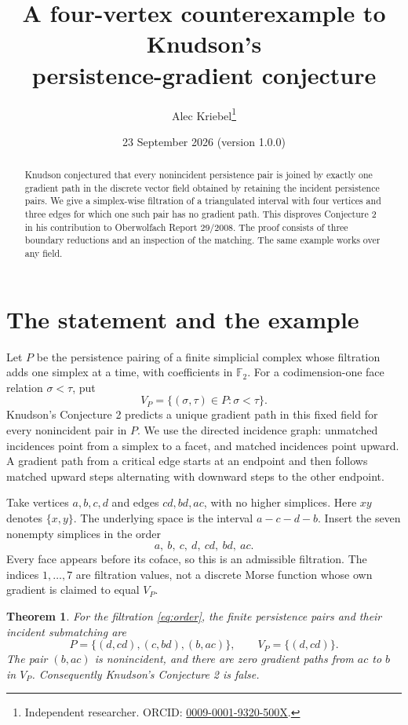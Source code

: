 \documentclass[11pt]{article}
\title{A four-vertex counterexample to Knudson's\protect\\ persistence-gradient conjecture}
\author{Alec Kriebel\thanks{Independent researcher. ORCID: \href{https://orcid.org/0009-0001-9320-500X}{0009-0001-9320-500X}.}}
\date{23 September 2026 \quad (version 1.0.0)}
\newtheorem{theorem}{Theorem}
\newcommand{\F}{\mathbb F}
\begin{document}
\maketitle
\begin{abstract}
Knudson conjectured that every nonincident persistence pair is joined by
exactly one gradient path in the discrete vector field obtained by retaining
the incident persistence pairs. We give a simplex-wise filtration of a
triangulated interval with four vertices and three edges for which one such
pair has no gradient path. This disproves Conjecture 2 in his contribution
to Oberwolfach Report 29/2008. The proof consists of three boundary reductions
and an inspection of the matching. The same example works over any field.
\end{abstract}

\section{The statement and the example}
Let $P$ be the persistence pairing of a finite simplicial complex whose
filtration adds one simplex at a time, with coefficients in $\F_2$.
For a codimension-one face relation $\sigma<\tau$, put
\[
 V_P=\{(\sigma,\tau)\in P:\sigma<\tau\}.
\]
Knudson's Conjecture 2 \cite[p.~1629]{Knudson} predicts a unique gradient
path in this fixed field for every nonincident pair in $P$.
We use the directed incidence graph: unmatched incidences point from a
simplex to a facet, and matched incidences point upward. A gradient path
from a critical edge starts at an endpoint and then follows matched upward
steps alternating with downward steps to the other endpoint.

Take vertices $a,b,c,d$ and edges $cd,bd,ac$, with no higher simplices.
Here $xy$ denotes $\{x,y\}$. The underlying space is the interval
$a\! -\! c\! -\! d\! -\! b$.
Insert the seven nonempty simplices in the order
\begin{equation}\label{eq:order}
             a,\ b,\ c,\ d,\ cd,\ bd,\ ac.
\end{equation}
Every face appears before its coface, so this is an admissible filtration.
The indices $1,\ldots,7$ are filtration values, not a discrete Morse function
whose own gradient is claimed to equal $V_P$.

\begin{theorem}
For the filtration \eqref{eq:order}, the finite persistence pairs and their
incident submatching are
\[
 P=\{(d,cd),(c,bd),(b,ac)\},\qquad V_P=\{(d,cd)\}.
\]
The pair $(b,ac)$ is nonincident, and there are zero gradient paths from
$ac$ to $b$ in $V_P$. Consequently Knudson's Conjecture 2 is false.
\end{theorem}
\end{document}
